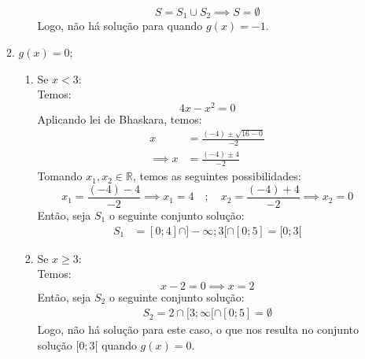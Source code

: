 \documentclass[13pt,letterpaper]{article}
\begin{document}
\begin{enumerate}
\begin{enumerate}
\begin{enumerate}
                    \begin{displaymath}
                        S = S_1 \cup S_2 \implies S = \emptyset
                    \end{displaymath} 
                    Logo, não há solução para quando $g(x) = -1$.
                \end{enumerate}
            \item $g(x) = 0$;
            \begin{enumerate}
                \item Se $x < 3$: \\
                    Temos:
                    \begin{displaymath}
                        4x - x^2 = 0
                    \end{displaymath}
                    Aplicando lei de Bhaskara, temos:
                    \begin{align*}
                        x &= \frac{(-4) \pm \sqrt{16 - 0}}{-2} \\ \implies
                        x &= \frac{(-4) \pm 4}{-2}
                    \end{align*}
                    Tomando $x_1, x_2 \in \mathbb{R}$, temos as seguintes possibilidades:
                    \begin{displaymath}
                        x_1 = \frac{(-4) - 4}{-2} \implies x_1 = 4 \quad ; \quad
                        x_2 = \frac{(-4) + 4}{-2} \implies x_2 = 0
                    \end{displaymath}
                    Então, seja $S_1$ o seguinte conjunto solução:
                    \begin{align*}
                        S_1 &= [0; 4] \cap ]-\infty; 3[ \cap  [0; 5] = [0; 3[
                    \end{align*}
                \item Se $x \ge 3$: \\
                    Temos: 
                    \begin{displaymath}
                        x - 2 = 0 \implies x = 2
                    \end{displaymath}
                    Então, seja $S_2$ o seguinte conjunto solução:
                    \begin{align*}
                        S_2 = 2 \cap [3; \infty[ \cap [0; 5] = \emptyset
                    \end{align*}
                    Logo, não há solução para este caso, o que nos resulta no conjunto solução $[0; 3[$ quando $g(x) = 0$.

\end{enumerate}
\end{enumerate}
\end{enumerate}
\end{document}
